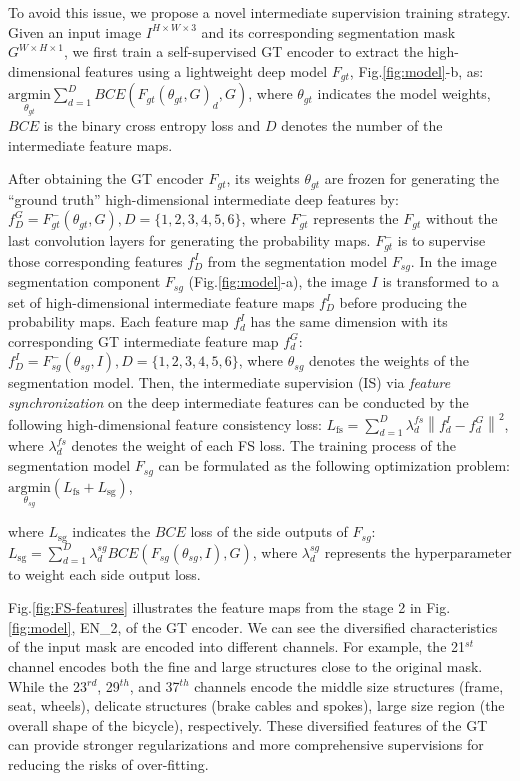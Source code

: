 To avoid this issue, we propose a novel intermediate supervision training strategy. Given an input image $I^{H \times W \times 3}$ and its corresponding segmentation mask $G^{W \times H \times 1}$, we first train a self-supervised GT encoder to extract the high-dimensional features using a lightweight deep model $F_{gt}$, Fig.\ref{fig:model}-b, as: 
$\underset{\theta_{gt}}{\mathrm{argmin}}\sum_{d=1}^{D}BCE(F_{gt}(\theta_{gt},G)_d,G)$, where $\theta_{gt}$ indicates the model weights, $BCE$ is the binary cross entropy loss and $D$ denotes the number of the intermediate feature maps. 

After obtaining the GT encoder $F_{gt}$, its weights $\theta_{gt}$ are frozen for generating the ``ground truth'' high-dimensional intermediate deep features by: $f_D^G = F_{gt}^-(\theta_{gt}, G), D = \{1, 2, 3, 4, 5, 6\}$, 
where $F_{gt}^-$ represents the $F_{gt}$ without the last convolution layers for generating the probability maps. $F_{gt}^-$ is to supervise those corresponding features $f_D^I$ from the segmentation model $F_{sg}$. In the image segmentation component $F_{sg}$ (Fig.\ref{fig:model}-a), the image $I$ is transformed to a set of high-dimensional intermediate feature maps $f_D^I$ before producing the probability maps. Each feature map $f_d^I$ has the same dimension with its corresponding GT intermediate feature map $f_d^G$: $f_D^I = F_{sg}^-(\theta_{sg}, I), D = \{1, 2, 3, 4, 5, 6\}$, 
where $\theta_{sg}$ denotes the weights of the segmentation model. Then, the intermediate supervision (IS) via \textit{feature synchronization} on the deep intermediate features can be conducted by the following high-dimensional feature consistency loss: 
$L_{\text{fs}} = \sum_{d=1}^{D}\lambda^{fs}_d\left\|f_{d}^{I}-f_{d}^{G}\right\|^{2}$, 
where $\lambda^{fs}_d$ denotes the weight of each FS loss. The training process of the segmentation model $F_{sg}$ can be formulated as the following optimization problem:
$\underset{\theta_{sg}}{\mathrm{argmin}}(L_{\text{fs}} + L_{\text{sg}})$, 

where $L_{\text{sg}}$ indicates the $BCE$ loss of the side outputs of $F_{sg}$: 
$L_{\text{sg}} = \sum_{d=1}^{D}\lambda^{sg}_d{BCE(F_{sg}(\theta_{sg}, I), G)}$, where $\lambda^{sg}_d$ represents the hyperparameter to weight each side output loss. 

Fig.\ref{fig:FS-features} illustrates the feature maps from the stage 2 in Fig.\ref{fig:model}, EN\_2, of the GT encoder. We can see the diversified characteristics of the input mask are encoded into different channels. For example, the 21$^{st}$ channel encodes both the fine and large structures close to the original mask. While the 23$^{rd}$, 29$^{th}$, and 37$^{th}$ channels encode the middle size structures (frame, seat, wheels), delicate structures (brake cables and spokes), large size region (the overall shape of the bicycle), respectively. These diversified features of the GT can provide stronger regularizations and more comprehensive supervisions for reducing the risks of over-fitting. 

